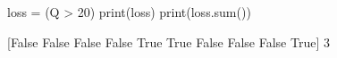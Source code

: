 
loss = (Q > 20)
print(loss)
print(loss.sum())

[False False False False  True  True False False False  True]
3

